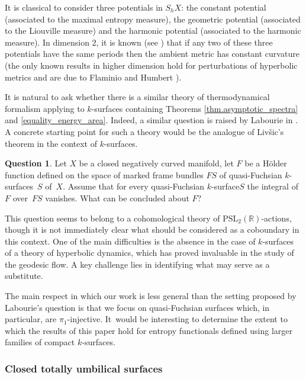 \documentclass[JEP,XML,SOM,Unicode,NoEqCountersInSection,published]{cedram}
\newcommand{\ksurface}{$k$\nobreakdash-surface\xspace}
\newcommand{\ksurfaces}{$k$\nobreakdash-surfaces\xspace}
\theoremstyle{plain}
\theoremstyle{definition}
\newtheorem{question}[theorem]{Question}
\newcommand\PSL{\mathrm{PSL}_2(\mathbb{R})}
\begin{document}
It is classical to consider three potentials in $S_hX$: the constant potential (associated to the maximal entropy measure), the geometric potential (associated to the Liouville measure) and the harmonic potential (associated to the harmonic measure). In dimension $2$, it is known (see \cite{Katok_entropy_closed,Katok4,Ledrappier_har_BM}) that if any two of these three potentials have the same periods then the ambient metric has constant curvature (the only known results in higher dimension hold for perturbations of hyperbolic metrics and are due to Flaminio \cite{Flaminio} and Humbert \cite{humbert2024katok}).

It is natural to ask whether there is a similar theory of thermodynamical formalism applying to \ksurfaces containing Theorems \ref{thm.asymptotic_spectra} and \ref{equality_energy_area}. Indeed, a similar question is raised by Labourie in \cite[Quest.\,8]{Labourie_phase_space}. A concrete starting point for such a theory would be the analogue of Liv\v{s}ic's theorem in the context of \ksurfaces.

\begin{question}
Let $X$ be a closed negatively curved manifold, let $F$ be a Hölder function defined on the space of marked frame bundles $FS$ of quasi-Fuchsian $k$\nobreakdash-sur\-faces~$S$ of~$X$. Assume that for every quasi-Fuchsian \ksurface $S$ the integral of $F$ over~$FS$ vanishes. What can be concluded about $F$?
\end{question}

This question seems to belong to a cohomological theory of $\PSL$-actions, though it is not immediately clear what should be considered as a coboundary in this context. One of the main difficulties is the absence in the case of \ksurfaces of a theory of hyperbolic dynamics, which has proved invaluable in the study of the geodesic flow. A key challenge lies in identifying what may serve as a substitute.

The main respect in which our work is less general than the setting proposed by Labourie's question is that we focus on quasi-Fuchsian surfaces which, in particular, are $\pi_1$-injective. It~would be interesting to determine the extent to which the results of this paper hold for entropy functionals defined using larger families of compact \ksurfaces.

\subsubsection{Closed totally umbilical surfaces}
\end{document}
